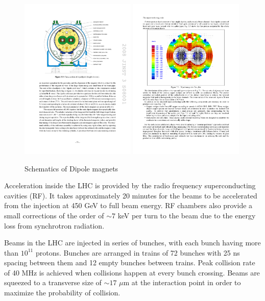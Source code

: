 \begin{figure}[htbp]
	\centering
  		\includegraphics[width=0.49\textwidth]{Figures/LHC_magnet.pdf}
  		\includegraphics[width=0.49\textwidth]{Figures/LHC_MagVec.pdf}
	\caption[Schematics of dipole magnets]{Schematics of Dipole magnets \cite{Evans:2008zzb, Bruning:782076}}
	\label{fig:LHC_mag}
\end{figure}

\par Acceleration inside the LHC is provided by the radio frequency superconducting cavities (RF). It takes approximately 20 minutes for the beams to be accelerated from the injection at 450 GeV to full beam energy. RF chambers also provide a small corrections of the order of $\sim 7$ keV per turn to the beam due to the energy loss from synchrotron radiation.  
\par Beams in the LHC are injected in series of bunches, with each bunch having more than $10^{11}$ protons. Bunches are arranged in trains of 72 bunches with 25 ns spacing between them and 12 empty bunches between trains. Peak collision rate of 40 MHz is achieved when collisions happen at every bunch crossing. Beams are squeezed to a transverse size of $\sim 17$ $\mu$m at the interaction point in order to maximize the probability of collision.  
    

